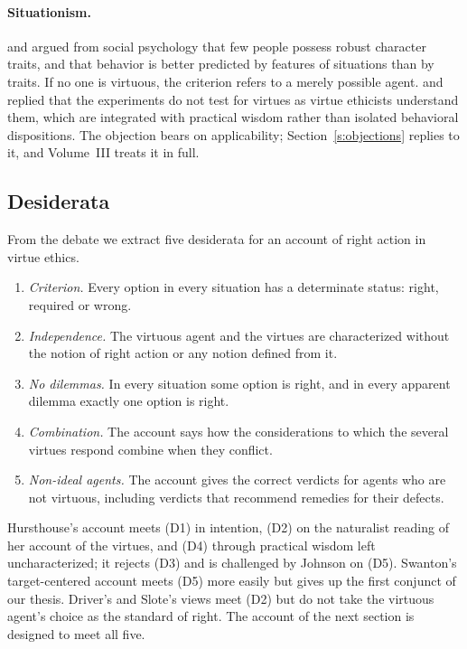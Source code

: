\documentclass{situationist-preprint}
\begin{document}
\paragraph{Situationism.} \citet{Harman1999} and \citet{Doris2002} argued from social psychology that few people possess robust character traits, and that behavior is better predicted by features of situations than by traits. If no one is virtuous, the criterion refers to a merely possible agent. \citet{Kamtekar2004} and \citet{Sreenivasan2002} replied that the experiments do not test for virtues as virtue ethicists understand them, which are integrated with practical wisdom rather than isolated behavioral dispositions. The objection bears on applicability; Section~\ref{s:objections} replies to it, and Volume~III treats it in full.

\subsection{Desiderata}

From the debate we extract five desiderata for an account of right action in virtue ethics.

\begin{enumerate}[label=(D\arabic*)]
\item \emph{Criterion.} Every option in every situation has a determinate status: right, required or wrong.
\item \emph{Independence.} The virtuous agent and the virtues are characterized without the notion of right action or any notion defined from it.
\item \emph{No dilemmas.} In every situation some option is right, and in every apparent dilemma exactly one option is right.
\item \emph{Combination.} The account says how the considerations to which the several virtues respond combine when they conflict.
\item \emph{Non-ideal agents.} The account gives the correct verdicts for agents who are not virtuous, including verdicts that recommend remedies for their defects.
\end{enumerate}

Hursthouse's account meets (D1) in intention, (D2) on the naturalist reading of her account of the virtues, and (D4) through practical wisdom left uncharacterized; it rejects (D3) and is challenged by Johnson on (D5). Swanton's target-centered account meets (D5) more easily but gives up the first conjunct of our thesis. Driver's and Slote's views meet (D2) but do not take the virtuous agent's choice as the standard of right. The account of the next section is designed to meet all five.
\end{document}
